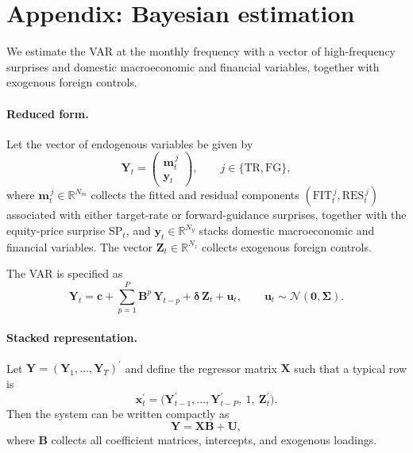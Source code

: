 \documentclass[\latexroot/\projectname]{subfiles}
\begin{document}
\section{Appendix: Bayesian estimation}
\setcounter{equation}{0}
\hypertarget{Appendix A}{}

We estimate the VAR at the monthly frequency with a vector of high-frequency surprises and domestic macroeconomic and financial variables, together with exogenous foreign controls.

\paragraph{Reduced form.}
Let the vector of endogenous variables be given by
\[
\boldsymbol{Y}_t =
\begin{pmatrix}
\boldsymbol{m}_t^{\,j} \\
\boldsymbol{y}_t
\end{pmatrix},
\qquad j \in \{\text{TR}, \text{FG}\},
\]
where $\boldsymbol{m}_t^{\,j} \in \mathbb{R}^{N_m}$ collects the fitted and residual components $(\text{FIT}_t^{\,j}, \text{RES}_t^{\,j})$ associated with either target-rate or forward-guidance surprises, together with the equity-price surprise $\text{SP}_t$, and $\boldsymbol{y}_t \in \mathbb{R}^{N_y}$ stacks domestic macroeconomic and financial variables. The vector $\boldsymbol{Z}_t \in \mathbb{R}^{N_z}$ collects exogenous foreign controls.

The VAR is specified as
\begin{equation}
\label{eq:A1_VAR}
\boldsymbol{Y}_t
=
\boldsymbol{c}
+ \sum_{p=1}^{P}
\boldsymbol{B}^{p}\,\boldsymbol{Y}_{t-p}
+ \boldsymbol{\delta}\,\boldsymbol{Z}_t
+ \boldsymbol{u}_t,
\qquad
\boldsymbol{u}_t \sim \mathcal{N}(\mathbf{0}, \boldsymbol{\Sigma}).
\end{equation}

\paragraph{Stacked representation.}
Let $\boldsymbol{Y} = (\boldsymbol{Y}_1,\dots,\boldsymbol{Y}_T)^\prime$ and define the regressor matrix $\boldsymbol{X}$ such that a typical row is
\[
\boldsymbol{x}_t^\prime =
\big(\boldsymbol{Y}_{t-1}^\prime,\ldots,\boldsymbol{Y}_{t-P}^\prime,\ 1,\ \boldsymbol{Z}_t^\prime\big).
\]
Then the system can be written compactly as
\[
\boldsymbol{Y} = \boldsymbol{X}\boldsymbol{B} + \boldsymbol{U},
\]
where $\boldsymbol{B}$ collects all coefficient matrices, intercepts, and exogenous loadings.
\end{document}
